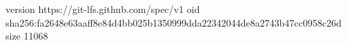 version https://git-lfs.github.com/spec/v1
oid sha256:fa2648e63aaff8e84d4bb025b1350999dda22342044de8a2743b47cc0958c26d
size 11068
